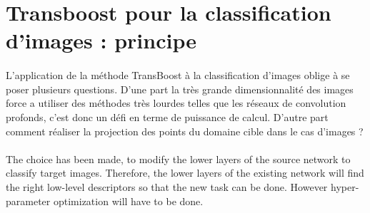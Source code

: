 \documentclass[11 pt]{article}
\begin{document}
\section{Transboost pour la classification d'images : principe}

\paragraph{}L’application de la méthode TransBoost à la classification d’images oblige à se poser plusieurs questions. D’une part la très grande dimensionnalité des images force a utiliser des méthodes très lourdes telles que les réseaux de convolution profonds, c'est donc un défi en terme de puissance de calcul. D’autre part comment réaliser la projection des points du domaine cible dans le cas d'images ?


\paragraph{} The choice has been made, to modify the lower layers of the source network to classify target images. Therefore, the lower layers of the existing network will find the right low-level descriptors so that the new task can be done. However hyper-parameter optimization will have to be done.
\end{document}
